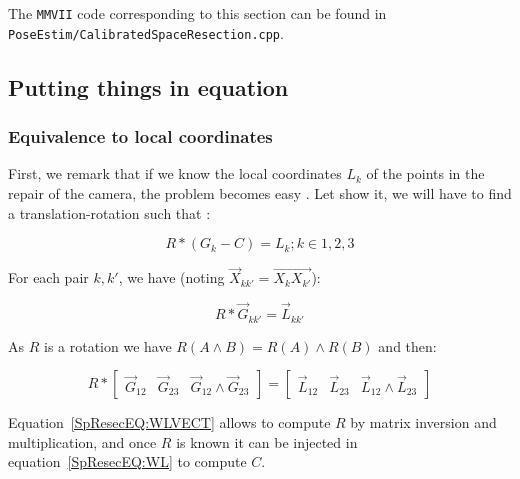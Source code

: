 The {\tt MMVII} code corresponding to this section can be found in 
{\tt PoseEstim/CalibratedSpaceResection.cpp}.


\subsection{Putting things in equation}

\subsubsection{Equivalence to local coordinates}

\label{SpRes:EquivLocCoord}

First, we remark that if we know the local coordinates $L_k$ of the points in the repair
of the camera, the problem becomes easy . Let show it, we will have to find a translation-rotation such that  :

\begin{equation}
       R*(G_k-C) = L_k  ; k\in{1,2,3} \label{SpResecEQ:WL}
\end{equation}


For each pair $k,k'$, we have (noting $\Vec{X}_{kk'} = \overrightarrow{X_{k}X_{k'}} $):


\begin{equation}
	R* \Vec{G}_{kk'} =  \Vec{L}_{kk'} \label{SpResecEQ:WLVECT}
\end{equation}

As  $R$ is a rotation we have $R(A \wedge  B) = R(A) \wedge   R(B) $ and then:

\begin{equation}
	R* \begin{bmatrix} \Vec{G}_{12} & \Vec{G}_{23} &  \Vec{G}_{12} \wedge \Vec{G}_{23} \end{bmatrix} 
        =  \begin{bmatrix} \Vec{L}_{12} & \Vec{L}_{23} &  \Vec{L}_{12} \wedge \Vec{L}_{23} \end{bmatrix} 
        \label{SpResecEQ:WLVECT}
\end{equation}

Equation~\ref{SpResecEQ:WLVECT} allows to compute $R$ by matrix inversion and multiplication, and 
once $R$ is known it can be injected in equation~\ref{SpResecEQ:WL} to compute $C$.

